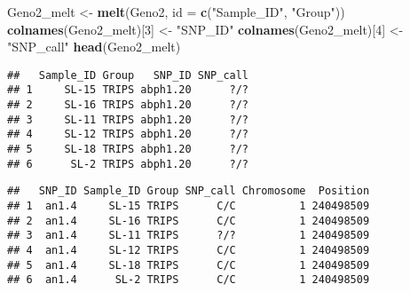 \documentclass[]{article}
\newenvironment{Shaded}{\begin{snugshade}}{\end{snugshade}}
\newcommand{\KeywordTok}[1]{\textcolor[rgb]{0.13,0.29,0.53}{\textbf{#1}}}
\newcommand{\DataTypeTok}[1]{\textcolor[rgb]{0.13,0.29,0.53}{#1}}
\newcommand{\DecValTok}[1]{\textcolor[rgb]{0.00,0.00,0.81}{#1}}
\newcommand{\StringTok}[1]{\textcolor[rgb]{0.31,0.60,0.02}{#1}}
\newcommand{\OperatorTok}[1]{\textcolor[rgb]{0.81,0.36,0.00}{\textbf{#1}}}
\newcommand{\NormalTok}[1]{#1}
\begin{document}
\begin{Shaded}
\begin{Highlighting}[]
\NormalTok{Geno2_melt <-}\StringTok{ }\KeywordTok{melt}\NormalTok{(Geno2, }\DataTypeTok{id =} \KeywordTok{c}\NormalTok{(}\StringTok{"Sample_ID"}\NormalTok{, }\StringTok{"Group"}\NormalTok{))}
\KeywordTok{colnames}\NormalTok{(Geno2_melt)[}\DecValTok{3}\NormalTok{] <-}\StringTok{ "SNP_ID"}
\KeywordTok{colnames}\NormalTok{(Geno2_melt)[}\DecValTok{4}\NormalTok{] <-}\StringTok{ "SNP_call"}
\KeywordTok{head}\NormalTok{(Geno2_melt)}
\end{Highlighting}
\end{Shaded}

\begin{verbatim}
##   Sample_ID Group   SNP_ID SNP_call
## 1     SL-15 TRIPS abph1.20      ?/?
## 2     SL-16 TRIPS abph1.20      ?/?
## 3     SL-11 TRIPS abph1.20      ?/?
## 4     SL-12 TRIPS abph1.20      ?/?
## 5     SL-18 TRIPS abph1.20      ?/?
## 6      SL-2 TRIPS abph1.20      ?/?
\end{verbatim}

\begin{Shaded}
\end{Shaded}

\begin{verbatim}
##   SNP_ID Sample_ID Group SNP_call Chromosome  Position
## 1  an1.4     SL-15 TRIPS      C/C          1 240498509
## 2  an1.4     SL-16 TRIPS      C/C          1 240498509
## 3  an1.4     SL-11 TRIPS      ?/?          1 240498509
## 4  an1.4     SL-12 TRIPS      C/C          1 240498509
## 5  an1.4     SL-18 TRIPS      C/C          1 240498509
## 6  an1.4      SL-2 TRIPS      C/C          1 240498509
\end{verbatim}
\end{document}

